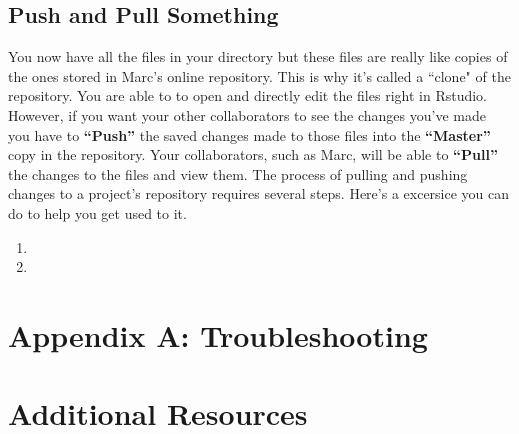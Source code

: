 \documentclass{article}\usepackage[]{graphicx}\usepackage[]{color}
\begin{document}
  \subsection*{Push and Pull Something}
  You now have all the files in your directory but these files are really like copies of the ones stored in Marc's online repository. This is why it's called a ``clone" of the repository. You are able to to open and directly edit the files right in Rstudio. However, if you want your other collaborators to see the changes you've made you have to \textbf{``Push''} the saved changes made to those files into the \textbf{``Master''} copy in the repository. Your collaborators, such as Marc, will be able to \textbf{``Pull''} the changes to the files and view them. The process of pulling and pushing changes to a project's repository requires several steps. Here's a excersice you can do to help you get used to it. 
  \begin{enumerate}
  \item
  \item
  \end{enumerate}
\section{Appendix A: Troubleshooting}
\section{Additional Resources}
\end{document}
